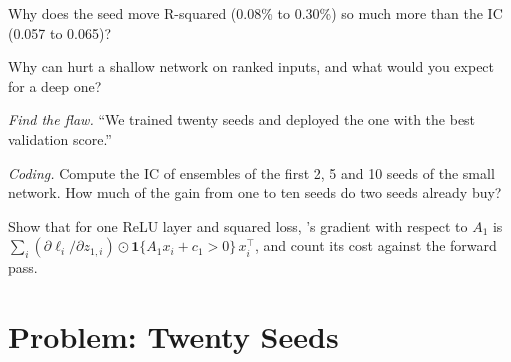\begin{exercise}[$\star\star$]\label{exo:ml:neural-networks-for-noisy-tabular-data:4}
Why does the seed move R-squared (0.08\% to 0.30\%) so much more than the IC (0.057 to 0.065)?
\end{exercise}

\begin{exercise}[$\star\star$]\label{exo:ml:neural-networks-for-noisy-tabular-data:5}
Why can  hurt a shallow network on ranked inputs, and what would you expect for a deep one?
\end{exercise}

\begin{exercise}[$\star\star$]\label{exo:ml:neural-networks-for-noisy-tabular-data:6}
\emph{Find the flaw.} ``We trained twenty seeds and deployed the one with the best validation score.''
\end{exercise}

\begin{exercise}[$\star\star\star$]\label{exo:ml:neural-networks-for-noisy-tabular-data:7}
\emph{Coding.} Compute the IC of ensembles of the first 2, 5 and 10 seeds of the small network. How much of the gain from
one to ten seeds do two seeds already buy?
\end{exercise}

\begin{exercise}[$\star\star\star$]\label{exo:ml:neural-networks-for-noisy-tabular-data:8}
Show that for one ReLU layer and squared loss, 's gradient with respect to $A_1$ is $\sum_i
(\partial\ell_i/\partial z_{1,i})\odot\mathbf 1\{A_1x_i + c_1 > 0\}\,x_i^\top$, and count its cost against the forward
pass.
\end{exercise}

\section{Problem: Twenty Seeds}

